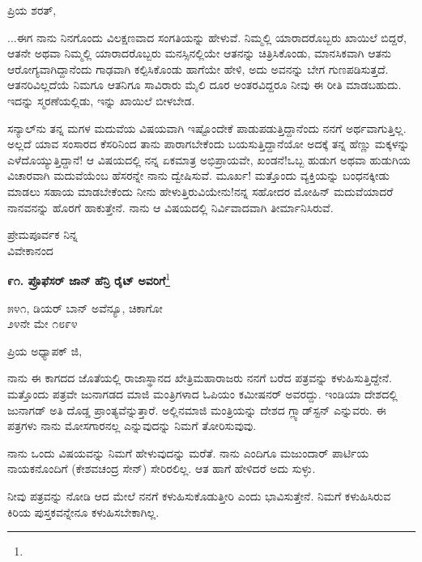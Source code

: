 \noindent
ಪ್ರಿಯ ಶರತ್,

...ಈಗ ನಾನು ನಿನಗೊಂದು ವಿಲಕ್ಷಣವಾದ ಸಂಗತಿಯನ್ನು ಹೇಳುವೆ. ನಿಮ್ಮಲ್ಲಿ ಯಾರಾದರೊಬ್ಬರು ಖಾಯಿಲೆ ಬಿದ್ದರೆ, ಆತನೇ ಅಥವಾ ನಿಮ್ಮಲ್ಲಿ ಯಾರಾದರೊಬ್ಬರು ಮನಸ್ಸಿನಲ್ಲಿಯೇ ಆತನನ್ನು ಚಿತ್ರಿಸಿಕೊಂಡು, ಮಾನಸಿಕವಾಗಿ ಆತನು ಆರೋಗ್ಯವಾಗಿದ್ದಾನೆಂದು ಗಾಢವಾಗಿ ಕಲ್ಪಿಸಿಕೊಂಡು ಹಾಗೆಯೇ ಹೇಳಿ, ಅದು ಅವನನ್ನು ಬೇಗ ಗುಣಪಡಿಸುತ್ತದೆ. ಆತನರಿವಿಲ್ಲದೆಯೆ ನಿಮಗೂ ಆತನಿಗೂ ಸಾವಿರಾರು ಮೈಲಿ ದೂರ ಅಂತರವಿದ್ದರೂ ನೀವು ಈ ರೀತಿ ಮಾಡಬಹುದು. ಇದನ್ನು ಸ್ಮರಣೆಯಲ್ಲಿಡು, ಇನ್ನು ಖಾಯಿಲೆ ಬೀಳಬೇಡ.

\vspace{0.2cm}

ಸನ್ಯಾಲ್‌ನು ತನ್ನ ಮಗಳ ಮದುವೆಯ ವಿಷಯವಾಗಿ ಇಷ್ಟೊಂದೇಕೆ ಪಾಡುಪಡುತ್ತಿದ್ದಾನೆಂದು ನನಗೆ ಅರ್ಥವಾಗುತ್ತಿಲ್ಲ. ಅಲ್ಲದೆ ಯಾವ ಸಂಸಾರದ ಕೆಸರಿನಿಂದ ತಾನು ಪಾರಾಗಬೇಕೆಂದು ಬಯಸುತ್ತಿದ್ದಾನೆಯೋ ಅದಕ್ಕೆ ತನ್ನ ಹೆಣ್ಣು ಮಕ್ಕಳನ್ನು ಎಳೆದೊಯ್ಯುತ್ತಿದ್ದಾನೆ! ಆ ವಿಷಯದಲ್ಲಿ ನನ್ನ ಏಕಮಾತ್ರ ಅಭಿಪ್ರಾಯವೇ, ಖಂಡನೆ!ಒಬ್ಬ ಹುಡುಗ ಅಥವಾ ಹುಡುಗಿಯ ವಿಚಾರವಾಗಿ ಮದುವೆಯೆಂಬ ಹೆಸರನ್ನೇ ನಾನು ದ್ವೇಷಿಸುವೆ. ಮೂರ್ಖ! ಮತ್ತೊಂದು ವ್ಯಕ್ತಿಯನ್ನು ಬಂಧನಕ್ಕೀಡು ಮಾಡಲು ಸಹಾಯ ಮಾಡಬೇಕೆಂದು ನೀನು ಹೇಳುತ್ತಿರುವಿಯೇನು!ನನ್ನ ಸಹೋದರ ಮೋಹಿನ್ ಮದುವೆಯಾದರೆ ನಾನವನನ್ನು ಹೊರಗೆ ಹಾಕುತ್ತೇನೆ. ನಾನು ಆ ವಿಷಯದಲ್ಲಿ ನಿರ್ವಿವಾದವಾಗಿ ತೀರ್ಮಾನಿಸಿರುವೆ.

{\flushright
ಪ್ರೇಮಪೂರ್ವಕ ನಿನ್ನ\\ವಿವೇಕಾನಂದ\par}

\newpage

\begin{center}
\textbf{೯೧. ಪ್ರೊಫೆಸರ್ ಜಾನ್ ಹೆನ್ರಿ ರೈಟ್ ಅವರಿಗೆ}\footnote{}
\end{center}

\begin{flushright}
೫೪೧, ಡಿಯರ್ ಬಾನ್ ಅವೆನ್ಯೂ, ಚಿಕಾಗೋ\\೨೪ನೇ ಮೇ ೧೮೯೪
\end{flushright}

\noindent
ಪ್ರಿಯ ಅಧ್ಯಾಪಕ್ ಜಿ,

ನಾನು ಈ ಕಾಗದದ ಜೊತೆಯಲ್ಲಿ ರಾಜಾಸ್ಥಾನದ ಖೇತ್ರಿಮಹಾರಾಜರು ನನಗೆ ಬರೆದ ಪತ್ರವನ್ನು ಕಳುಹಿಸುತ್ತಿದ್ದೇನೆ. ಮತ್ತೊಂದು ಪತ್ರವೇ ಜುನಾಗಡದ ಮಾಜಿ ಮಂತ್ರಿಗಳಾದ ಓಪಿಯಂ ಕಮೀಷನರ್ ಅವರದ್ದು. ಇಂಡಿಯಾ ದೇಶದಲ್ಲಿ ಜುನಾಗಡ್ ಅತಿ ದೊಡ್ಡ ಪ್ರಾಂತ್ಯವೆನ್ನುತ್ತಾರೆ. ಅಲ್ಲಿನಮಾಜಿ ಮಂತ್ರಿಯನ್ನು ದೇಶದ ಗ್ಲ್ಯಾಡ್‌ಸ್ಟನ್ ಎನ್ನುವರು. ಈ ಪತ್ರಗಳು ನಾನು ಮೋಸಗಾರನಲ್ಲ ಎನ್ನುವುದನ್ನು ನಿಮಗೆ ತೋರಿಸುವುವು.

ನಾನು ಒಂದು ವಿಷಯವನ್ನು ನಿಮಗೆ ಹೇಳುವುದನ್ನು ಮರೆತೆ. ನಾನು ಎಂದಿಗೂ ಮಜುಂದಾರ್ ಪಾರ್ಟಿಯ ನಾಯಕನೊಂದಿಗೆ (ಕೇಶವಚಂದ್ರ ಸೇನ್) ಸೇರಿರಲಿಲ್ಲ. ಆತ ಹಾಗೆ ಹೇಳಿದರೆ ಅದು ಸುಳ್ಳು.

ನೀವು ಪತ್ರವನ್ನು ನೋಡಿ ಆದ ಮೇಲೆ ನನಗೆ ಕಳುಹಿಸುಕೊಡುತ್ತೀರಿ ಎಂದು ಭಾವಿಸುತ್ತೇನೆ. ನಿಮಗೆ ಕಳುಹಿಸಿರುವ ಕಿರಿಯ ಪುಸ್ತಕವನ್ನೇನೂ ಕಳುಹಿಸಬೇಕಾಗಿಲ್ಲ.

